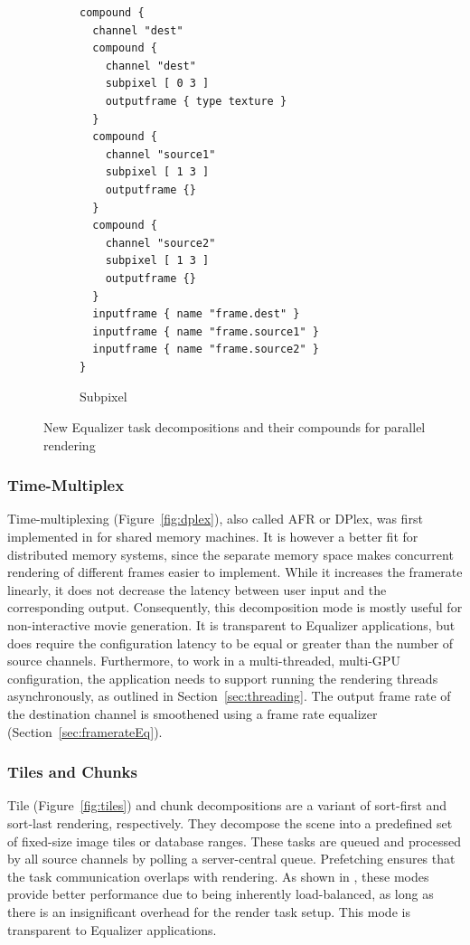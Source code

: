 \documentclass[10pt,journal,compsoc]{IEEEtran}
\newcommand{\sref}[1]{Section~\ref{#1}}
\newcommand{\fig}[1]{Figure~\ref{#1}}
\begin{document}
\begin{figure}[ht]
\begin{subfigure}[t]{0.24\textwidth}
{\begin{lstlisting}
compound {
  channel "dest"
  compound {
    channel "dest"
    subpixel [ 0 3 ]
    outputframe { type texture }
  }
  compound {
    channel "source1"
    subpixel [ 1 3 ]
    outputframe {}
  }
  compound {
    channel "source2"
    subpixel [ 1 3 ]
    outputframe {}
  }
  inputframe { name "frame.dest" }
  inputframe { name "frame.source1" }
  inputframe { name "frame.source2" }
}
    \end{lstlisting}\vspace{21ex}}
    \caption{\label{fig:subpixel}Subpixel}
  \end{subfigure}
  \caption{New Equalizer task decompositions and their compounds for parallel
    rendering}
  \label{fig:compounds}
\end{figure}


\subsubsection{Time-Multiplex}

Time-multiplexing (\fig{fig:dplex}), also called AFR or DPlex, was first
implemented in \cite{BRE:05} for shared memory machines. It is however a better
fit for distributed memory systems, since the separate memory space makes
concurrent rendering of different frames easier to implement. While it increases
the framerate linearly, it does not decrease the latency between user input and
the corresponding output. Consequently, this decomposition mode is mostly useful
for non-interactive movie generation. It is transparent to Equalizer
applications, but does require the configuration latency to be equal or greater
than the number of source channels. Furthermore, to work in a multi-threaded,
multi-GPU configuration, the application needs to support running the rendering
threads asynchronously, as outlined in \sref{sec:threading}. The output frame
rate of the destination channel is smoothened using a frame rate equalizer
(\sref{sec:framerateEq}).

\subsubsection{Tiles and Chunks}\label{sec:tile}

Tile (\fig{fig:tiles}) and chunk decompositions are a variant of sort-first and
sort-last rendering, respectively. They decompose the scene into a predefined
set of fixed-size image tiles or database ranges. These tasks are queued and
processed by all source channels by polling a server-central queue. Prefetching
ensures that the task communication overlaps with rendering. As shown in
\cite{SPEP:16}, these modes provide better performance due to being inherently
load-balanced, as long as there is an insignificant overhead for the render task
setup. This mode is transparent to Equalizer applications.
\end{document}
